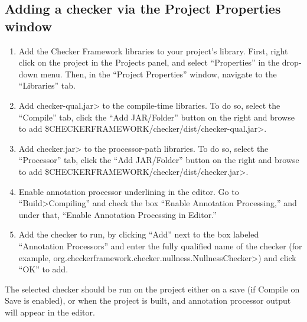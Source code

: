 

\subsection{Adding a checker via the Project Properties window\label{netbeans-project-properties}}

\begin{enumerate}
\item
  Add the Checker Framework libraries to your project's
  library. First, right click on the project in the Projects panel,
  and select ``Properties'' in the drop-down menu. Then, in the
  ``Project Properties'' window, navigate to the ``Libraries'' tab.

\item
  Add \<checker-qual.jar> to the compile-time libraries. To do so,
  select the ``Compile'' tab, click the ``Add JAR/Folder'' button on
  the right and browse to
  add \<\$CHECKERFRAMEWORK/checker/dist/checker-qual.jar>.

\item
  Add \<checker.jar> to the processor-path libraries. To do so, select
  the ``Processor'' tab, click the ``Add JAR/Folder'' button on the
  right and browse to
  add \<\$CHECKERFRAMEWORK/checker/dist/checker.jar>.

\item
  Enable annotation processor underlining in the editor. Go to
  ``Build>Compiling'' and check the box ``Enable Annotation
  Processing,'' and under that, ``Enable Annotation Processing in
  Editor.''

\item
  Add the checker to run, by clicking ``Add'' next to the box labeled
  ``Annotation Processors'' and enter the fully qualified name of the
  checker (for
  example, \<org.checkerframework.checker.nullness.NullnessChecker>)
  and click ``OK'' to add.
\end{enumerate}

The selected checker should be run on the project either on a save (if
Compile on Save is enabled), or when the project is built, and
annotation processor output will appear in the editor.



